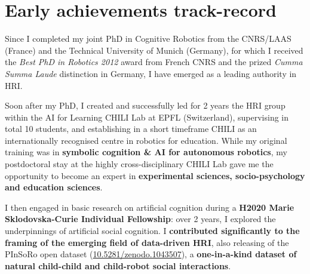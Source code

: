 \newpage
\chapter{Early achievements track-record}\label{early-achievements-track-record}


Since I completed my joint PhD in Cognitive Robotics from the CNRS/LAAS (France) and the
Technical University of Munich (Germany), for which I received the \emph{Best
PhD in Robotics 2012} award from French CNRS and the prized \emph{Cumma Summa
Laude} distinction in Germany, I have emerged as a leading authority in
HRI.

Soon after my PhD, I created and successfully led for 2 years the HRI group
within the AI for Learning CHILI Lab at EPFL (Switzerland), supervising in total
10 students, and establishing in a short timeframe CHILI as an internationally
recognised centre in robotics for education. While my original training was in
\textbf{symbolic cognition \& AI for autonomous robotics}, my postdoctoral stay
at the highly cross-disciplinary CHILI Lab gave me the opportunity to become an
expert in \textbf{experimental sciences, socio-psychology and education
sciences}.

I then engaged in basic research on artificial cognition during a \textbf{H2020 Marie
Sklodovska-Curie Individual Fellowship}: over 2 years, I explored the underpinnings of
artificial social cognition. I \textbf{contributed significantly to the framing
of the emerging field of data-driven HRI}, also releasing of the PInSoRo open
dataset (\href{https://doi.org/10.5281/zenodo.1043507}{10.5281/zenodo.1043507}),
a \textbf{one-in-a-kind dataset of natural child-child and child-robot social
interactions}.

